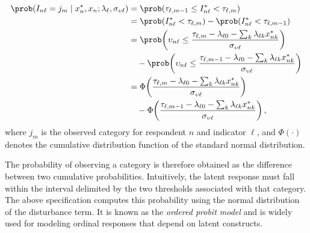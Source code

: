 \documentclass[12pt,a4paper]{article}
\begin{document}
\begin{equation}
  \label{eq:discreteMeas-d}
  \begin{aligned}
    \prob(I_{n\ell}=j_m \mid x_n^*,x_n;\lambda_\ell,\sigma_{\upsilon\ell})
    &=
    \prob\!\left(
      \tau_{\ell,m-1}
      \le
      I^*_{n\ell}
      <
      \tau_{\ell,m}
    \right)
    \\
    &=
    \prob\!\left(
      I^*_{n\ell}
      <
      \tau_{\ell,m}
    \right)
    -
    \prob\!\left(
      I^*_{n\ell}
      <
      \tau_{\ell,m-1}
    \right)
    \\
    &=
    \prob\!\left(
      \upsilon_{n\ell}
      \le
      \frac{
        \tau_{\ell,m}
        -\lambda_{\ell0}
        -\sum_k \lambda_{\ell k} x_{nk}^*
      }{\sigma_{\upsilon\ell}}
    \right)
    \\
    &\quad -
    \prob\!\left(
      \upsilon_{n\ell}
      \le
      \frac{
        \tau_{\ell,m-1}
        -\lambda_{\ell0}
        -\sum_k \lambda_{\ell k} x_{nk}^*
      }{\sigma_{\upsilon\ell}}
    \right)
    \\
    &=
    \Phi\!\left(
      \frac{
        \tau_{\ell,m}
        -\lambda_{\ell0}
        -\sum_k \lambda_{\ell k} x_{nk}^*
      }{\sigma_{\upsilon\ell}}
    \right)
    \\
    &\quad -
    \Phi\!\left(
      \frac{
        \tau_{\ell,m-1}
        -\lambda_{\ell0}
        -\sum_k \lambda_{\ell k} x_{nk}^*
      }{\sigma_{\upsilon\ell}}
    \right),
  \end{aligned}
\end{equation}
where \(j_m\) is the observed category for respondent \(n\) and
indicator \(\ell\), and \(\Phi(\cdot)\) denotes the cumulative
distribution function of the standard normal distribution.

The probability of observing a category is therefore obtained as the
difference between two cumulative probabilities. Intuitively, the
latent response must fall within the interval delimited by the two
thresholds associated with that category. The above specification
computes this probability using the normal distribution of the
disturbance term. It is known as the \emph{ordered probit model} and
is widely used for modeling ordinal responses that depend on latent
constructs.
\end{document}
